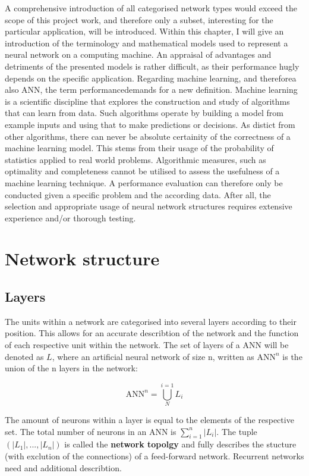 \documentclass[10pt,a4paper,DIV=11]{scrreprt}
\begin{document}
A comprehensive introduction of all categorised network types would exceed the scope of this project work, and therefore only a subset, interesting for the particular application, will be introduced. Within this chapter, I will give an introduction of the terminology and mathematical models used to represent a neural network on a computing machine. An appraisal of advantages and detriments of the presented models is rather difficult, as their performance hugly depends on the specific application. Regarding machine learning, and thereforea also ANN, the term performancedemands for a new definition. Machine learning is a scientific discipline that explores the construction and study of algorithms that can learn from data.\cite{MLDEF1} Such algorithms operate by building a model from example inputs and using that to make predictions or decisions.\cite{MLDEF2} As distict from other algorithms, there can never be absolute certainity of the correctness of a machine learning model. This stems from their usage of the probability of statistics applied to real world problems. Algorithmic measures, such as optimality and completeness cannot be utilised to assess the usefulness of a machine learning technique. A performance evaluation can therefore only be conducted given a specific problem and the according data. After all, the selection and appropriate usage of neural network structures requires extensive experience and/or thorough testing. 

\section{Network structure}
\subsection{Layers}
The units within a network are categorised into several layers according to their position. This allows for an accurate describtion of the network and the function of each respective unit within the network. The set of layers of a ANN will be denoted as $L$, where an artificial neural network of size n, written as $\text{ANN}^n$ is the union of the n layers in the network:

\begin{equation}
    \text{ANN}^n = \bigcup_{N}^{i=1}{L_i}
\end{equation}

The amount of neurons within a layer is equal to the elements of the respective set. The total number of neurons in an ANN is $\sum_{i=1}^{n}{|L_i|}$. The tuple $(|L_1|,...,|L_n|)$ is called the \textbf{network topolgy} and fully describes the stucture (with exclution of the connections) of a feed-forward network. Recurrent networks need and additional describtion.
\end{document}

